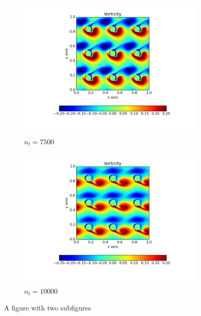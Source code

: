 \documentclass[10pt, a4paper]{article}
\begin{document}
\begin{figure}[htb!]
\begin{subfigure}{.5\textwidth}
  \includegraphics[width=1.1\linewidth, clip=true, trim=1cm 1cm 1cm 1cm]{q3_0003}
  \caption{$n_t = 7500$}
  \label{fig:sub1}
\end{subfigure}%
\begin{subfigure}{.5\textwidth}
  \centering
  \includegraphics[width=1.1\linewidth, clip=true, trim=1cm 1cm 1cm 1cm]{q3_0004}
  \caption{$n_t = 10000$}
  \label{fig:sub2}
\end{subfigure}
\caption{A figure with two subfigures}
\label{fig:test}
\end{figure}

\end{document}
